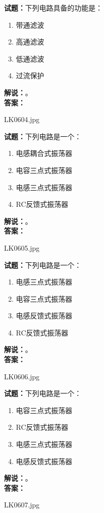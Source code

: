 \documentclass{ctexbook}
\begin{document}
\noindent\textbf{试题：}下列电路具备的功能是：
\begin{enumerate}[leftmargin=3em]
\item 带通滤波
\item 高通滤波
\item 低通滤波
\item 过流保护
\end{enumerate}
\noindent\textbf{解说：}\textbf{}。\\\noindent\textbf{答案：}

\bigskip

LK0604.jpg


\noindent\textbf{试题：}下列电路是一个：
\begin{enumerate}[leftmargin=3em]
\item 电感耦合式振荡器
\item 电容三点式振荡器
\item 电感三点式振荡器
\item RC反馈式振荡器
\end{enumerate}
\noindent\textbf{解说：}\textbf{}。\\\noindent\textbf{答案：}

\bigskip

LK0605.jpg


\noindent\textbf{试题：}下列电路是一个：
\begin{enumerate}[leftmargin=3em]
\item 电感三点式振荡器
\item 电容三点式振荡器
\item 电感反馈式振荡器
\item RC反馈式振荡器
\end{enumerate}
\noindent\textbf{解说：}\textbf{}。\\\noindent\textbf{答案：}

\bigskip

LK0606.jpg


\noindent\textbf{试题：}下列电路是一个：
\begin{enumerate}[leftmargin=3em]
\item 电容三点式振荡器
\item RC反馈式振荡器
\item 电感三点式振荡器
\item 电感反馈式振荡器
\end{enumerate}
\noindent\textbf{解说：}\textbf{}。\\\noindent\textbf{答案：}

\bigskip

LK0607.jpg
\end{document}
